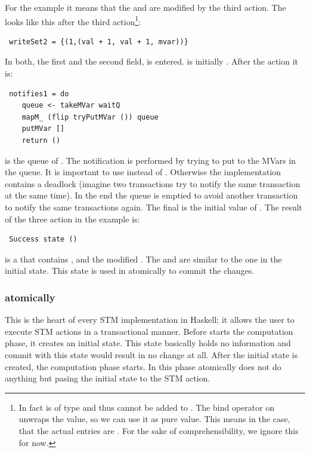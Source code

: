 For the example it means that the  and  are modified by the third 
action. The  looks like this after the third action\footnote{In fact  
is of type  and thus cannot be added to . The bind operator on 
unwraps the value, so we can use it as pure value. This means in the case, that the actual entries are
. For the sake of comprehensibility, we ignore this for now.}:
\begin{lstlisting}
 writeSet2 = {(1,(val + 1, val + 1, mvar))} 
\end{lstlisting}
In both, the first and the second field,  is entered.  is 
initially . After the  action it is:
\begin{lstlisting}
 notifies1 = do
    queue <- takeMVar waitQ
    mapM_ (flip tryPutMVar ()) queue
    putMVar []
    return ()
\end{lstlisting}
 is the queue of . The notification is performed by trying to put \code{()}
to the MVars in the queue. It is important to use  instead of .
Otherwise the implementation contains a deadlock (imagine two transactions try to notify the same 
transaction at the same time). In the end the queue is emptied to avoid another transaction to 
notify the same transactions again. The final  is the initial value of 
. The result of the three action in the example is:
\begin{lstlisting}
 Success state ()
\end{lstlisting}
 is a  that contains ,  and the 
modified . The  and  are similar to the one 
in the initial state. This state is used in atomically to commit the changes.


\subsubsection{atomically}
This is the heart of every STM implementation in Haskell; it allows the user to execute STM 
actions in a transactional manner. Before  starts the computation phase, it
creates an initial state. This state basically holds no information and commit with this state
would result in no change at all. After the initial state is created, the computation phase starts. 
In this phase atomically does not do anything but pasing the initial state to the STM action.

